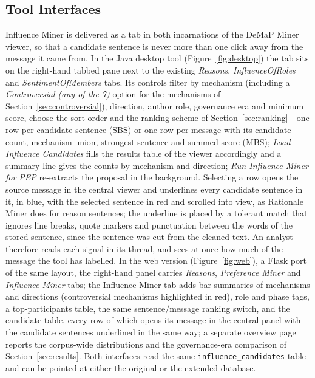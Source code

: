 \documentclass[sigconf,screen]{acmart}
\begin{document}
\subsection{Tool Interfaces}
\label{sec:interfaces}

Influence Miner is delivered as a tab in both incarnations of the DeMaP Miner viewer, so that a candidate sentence is never more than one click away from the message it came from. In the Java desktop tool (Figure~\ref{fig:desktop}) the tab sits on the right-hand tabbed pane next to the existing \emph{Reasons}, \emph{InfluenceOfRoles} and \emph{SentimentOfMembers} tabs. Its controls filter by mechanism (including a \emph{Controversial (any of the 7)} option for the mechanisms of Section~\ref{sec:controversial}), direction, author role, governance era and minimum score, choose the sort order and the ranking scheme of Section~\ref{sec:ranking}---one row per candidate sentence (SBS) or one row per message with its candidate count, mechanism union, strongest sentence and summed score (MBS); \emph{Load Influence Candidates} fills the results table of the viewer accordingly and a summary line gives the counts by mechanism and direction; \emph{Run Influence Miner for PEP} re-extracts the proposal in the background. Selecting a row opens the source message in the central viewer and underlines every candidate sentence in it, in blue, with the selected sentence in red and scrolled into view, as Rationale Miner does for reason sentences; the underline is placed by a tolerant match that ignores line breaks, quote markers and punctuation between the words of the stored sentence, since the sentence was cut from the cleaned text. An analyst therefore reads each signal in its thread, and sees at once how much of the message the tool has labelled. In the web version (Figure~\ref{fig:web}), a Flask port of the same layout, the right-hand panel carries \emph{Reasons}, \emph{Preference Miner} and \emph{Influence Miner} tabs; the Influence Miner tab adds bar summaries of mechanisms and directions (controversial mechanisms highlighted in red), role and phase tags, a top-participants table, the same sentence/message ranking switch, and the candidate table, every row of which opens its message in the central panel with the candidate sentences underlined in the same way; a separate overview page reports the corpus-wide distributions and the governance-era comparison of Section~\ref{sec:results}. Both interfaces read the same \texttt{influence\_candidates} table and can be pointed at either the original or the extended database.
\end{document}
